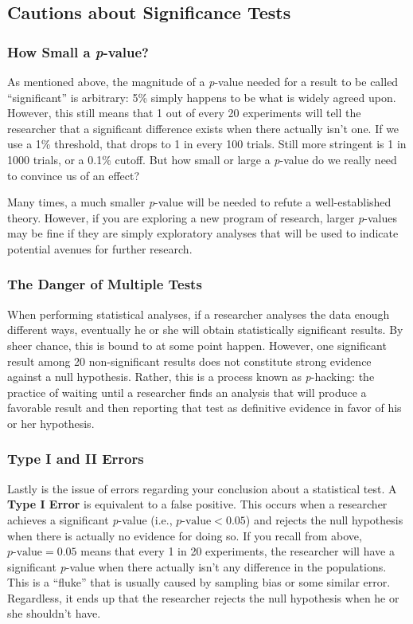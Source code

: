 \subsection{Cautions about Significance Tests}
\subsubsection{How Small a \textit{p}-value?}
As mentioned above, the magnitude of a \textit{p}-value needed for a result to be called ``significant'' is arbitrary: 5\% simply happens to be what is widely agreed upon. However, this still means that 1 out of every 20 experiments will tell the researcher that a significant difference exists when there actually isn't one. If we use a 1\% threshold, that drops to 1 in every 100 trials. Still more stringent is 1 in 1000 trials, or a 0.1\% cutoff. But how small or large a \textit{p}-value do we really need to convince us of an effect?

Many times, a much smaller \textit{p}-value will be needed to refute a well-established theory. However, if you are exploring a new program of research, larger \textit{p}-values may be fine if they are simply exploratory analyses that will be used to indicate potential avenues for further research.

\subsubsection{The Danger of Multiple Tests}
When performing statistical analyses, if a researcher analyses the data enough different ways, eventually he or she will obtain statistically significant results. By sheer chance, this is bound to at some point happen. However, one significant result among 20 non-significant results does not constitute strong evidence against a null hypothesis. Rather, this is a process known as \textit{p}-hacking: the practice of waiting until a researcher finds an analysis that will produce a favorable result and then reporting that test as definitive evidence in favor of his or her hypothesis.

\subsubsection{Type I and II Errors}
Lastly is the issue of errors regarding your conclusion about a statistical test. A \textbf{Type I Error}  is equivalent to a false positive. This occurs when a researcher achieves a significant \textit{p}-value (i.e., $p\text{-value}<0.05$) and rejects the null hypothesis when there is actually no evidence for doing so. If you recall from above, $p\text{-value}=0.05$ means that every 1 in 20 experiments, the researcher will have a significant \textit{p}-value when there actually isn't any difference in the populations. This is a ``fluke'' that is usually caused by sampling bias or some similar error. Regardless, it ends up that the researcher rejects the null hypothesis when he or she shouldn't have.

